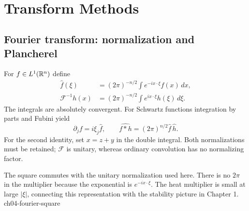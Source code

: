 \Needspace{65mm}
\section{Transform Methods}\label{sec:4-3}
\Needspace{35mm}
\subsection{Fourier transform: normalization and Plancherel}
For $f\in L^1(\mathbb{R}^n)$ define
\[
 \begin{aligned}
 \widehat f(\xi)&=(2\pi)^{-n/2}\int e^{-ix\cdot\xi}f(x)\,dx,\\
 \mathcal F^{-1}h(x)&=(2\pi)^{-n/2}\int e^{ix\cdot\xi}h(\xi)\,d\xi .
 \end{aligned}
\]
The integrals are absolutely convergent.
For Schwartz functions integration by parts and Fubini yield
\[
 \widehat{\partial_j f}=i\xi_j\widehat f,\qquad
 \widehat{f*h}=(2\pi)^{n/2}\widehat f\,\widehat h .
 \tag{F4}
\]
For the second identity, set $x=z+y$ in the double integral.
Both normalizations must be retained; $\mathcal F$ is unitary,
whereas ordinary convolution has no normalizing factor.
\Needspace{45mm}


{The square commutes with the unitary normalization used here. There is no $2\pi$ in the multiplier because the exponential is $e^{-ix\cdot\xi}$. The heat multiplier is small at large $|\xi|$, connecting this representation with the stability picture in Chapter 1.}
{ch04-fourier-square}

